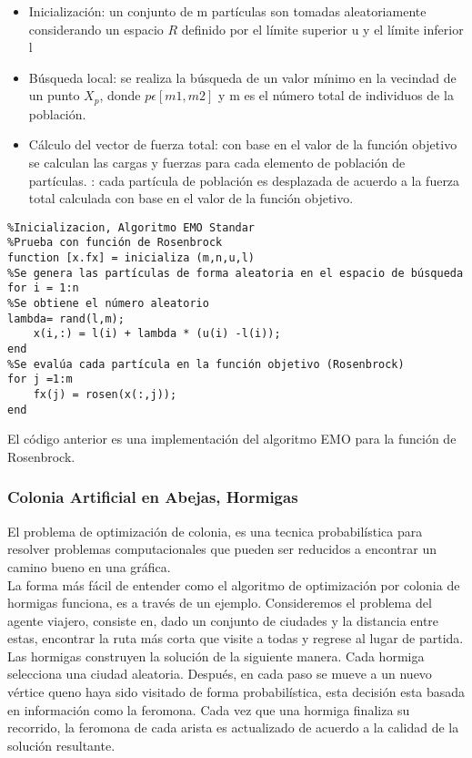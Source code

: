 \documentclass{article}
\begin{document}
\begin{itemize}
    \item Inicialización: un conjunto de m partículas son tomadas aleatoriamente considerando un espacio $R$ definido por el límite superior u y el límite inferior l
    \item Búsqueda local: se realiza la búsqueda de un valor mínimo en la vecindad de un punto $X_p$, donde $ p \epsilon [m1,m2]$ y m es el número total de individuos de la población.
    \item Cálculo del vector de fuerza total: con base en el valor de la función objetivo se calculan las cargas y fuerzas para cada elemento de población de partículas.
    \itemMovimiento: cada partícula de población es desplazada de acuerdo a la fuerza total calculada con base en el valor de la función objetivo.
\end{itemize}
\begin{verbatim}
%Inicializacion, Algoritmo EMO Standar
%Prueba con función de Rosenbrock
function [x.fx] = inicializa (m,n,u,l)
%Se genera las partículas de forma aleatoria en el espacio de búsqueda
for i = 1:n
%Se obtiene el número aleatorio
lambda= rand(l,m);
	x(i,:) = l(i) + lambda * (u(i) -l(i));
end
%Se evalúa cada partícula en la función objetivo (Rosenbrock)
for j =1:m
	fx(j) = rosen(x(:,j));
end             
\end{verbatim}

El código anterior es una implementación del algoritmo EMO para la función de Rosenbrock.
\subsubsection{Colonia Artificial en Abejas, Hormigas}
El problema de optimización de colonia, es una tecnica probabilística para resolver problemas computacionales que pueden ser reducidos a encontrar un camino bueno en una gráfica. \\ 

La forma más fácil de entender como el algoritmo de optimización por colonia de hormigas funciona, es a través de un ejemplo. Consideremos el problema del agente viajero, consiste en, dado un conjunto de ciudades y la distancia entre estas, encontrar la ruta más corta que visite a todas y regrese al lugar de partida. \\

Las hormigas construyen la solución de la siguiente manera. Cada hormiga selecciona una ciudad aleatoria. Después, en cada paso se mueve a un nuevo vértice queno haya sido visitado de forma probabilística, esta decisión esta basada en información como la feromona. Cada vez que una hormiga finaliza su recorrido, la feromona de cada arista es actualizado de acuerdo a la calidad de la solución resultante.
\end{document}
